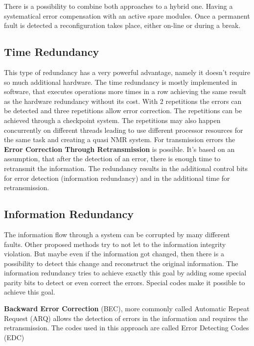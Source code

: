 There is a possibility to combine both approaches to a hybrid one. Having a systematical error compensation with an active spare modules. Once a permanent fault is detected a reconfiguration takes place, either on-line or during a break.


\subsection{Time Redundancy}
This type of redundancy has a very powerful advantage, namely it doesn't require so much additional hardware. The time redundancy is mostly implemented in software, that executes operations more times in a row achieving the same result as the hardware redundancy without its cost. With 2 repetitions the errors can be detected and three repetitions allow error correction. The repetitions can be achieved through a checkpoint system. The repetitions may also happen concurrently on different threads leading to use different processor resources for the same task and creating a quasi NMR system. For transmission errors the \textbf{Error Correction Through Retransmission} is possible. It's based on an assumption, that after the detection of an error, there is enough time to retransmit the information. The redundancy results in the additional control bits for error detection (information redundancy) and in the additional time for retransmission.

\subsection{Information Redundancy}\label{ssec:Infred}
The information flow through a system can be corrupted by many different faults. Other proposed methods try to not let to the information integrity violation. But maybe even if the information got changed, then there is a possibility to detect this change and reconstruct the original information. The information redundancy tries to achieve exactly this goal by adding some special parity bits to detect or even correct the errors. Special codes make it possible to achieve this goal.

\textbf{Backward Error Correction} (BEC), more commonly called Automatic Repeat Request (ARQ) allows the detection of errors in the information and requires the retransmission. The codes used in this approach are called Error Detecting Codes (EDC)

